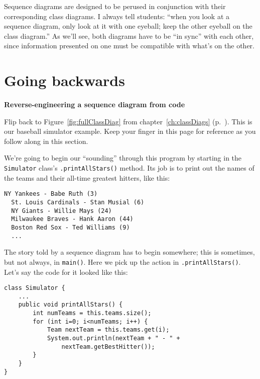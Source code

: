 Sequence diagrams are designed to be perused in conjunction with their
corresponding class diagrams. I always tell students: ``when you look at a
sequence diagram, only look at it with one eyeball; keep the other eyeball on
the class diagram.'' As we'll see, both diagrams have to be ``in sync'' with
each other, since information presented on one must be compatible with what's
on the other.

\section{Going backwards}

\vspace{-.1in}
{\large \textbf{Reverse-engineering a sequence diagram from code}}

Flip back to Figure~\ref{fig:fullClassDiag} from chapter~\ref{ch:classDiags}
(p.~\pageref{fig:fullClassDiag}). This is our baseball simulator example. Keep
your finger in this page for reference as you follow along in this section.

We're going to begin our ``sounding'' through this program by starting in the
\texttt{Simulator} class's \texttt{.printAllStars()} method. Its job is to
print out the names of the teams and their all-time greatest hitters, like
this:

\begin{Verbatim}[fontsize=\normalsize,samepage=true,frame=single]
  NY Yankees - Babe Ruth (3)
  St. Louis Cardinals - Stan Musial (6)
  NY Giants - Willie Mays (24)
  Milwaukee Braves - Hank Aaron (44)
  Boston Red Sox - Ted Williams (9)
  ...
\end{Verbatim}

The story told by a sequence diagram has to begin somewhere; this is
sometimes, but not always, in \texttt{main()}. Here we pick up the action in
\texttt{.printAllStars()}. Let's say the code for it looked like this:

\begin{Verbatim}[fontsize=\small,samepage=true,frame=single]
class Simulator {
    ...
    public void printAllStars() {
        int numTeams = this.teams.size();
        for (int i=0; i<numTeams; i++) {
            Team nextTeam = this.teams.get(i);
            System.out.println(nextTeam + " - " +
                nextTeam.getBestHitter());
        }
    }
}
\end{Verbatim}

